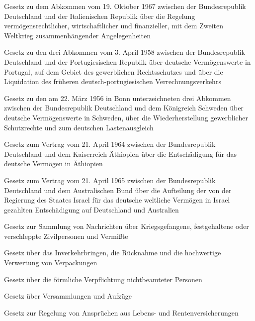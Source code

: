 \item[{VermRglAbkITAG}] Gesetz zu dem Abkommen vom 19. Oktober 1967 zwischen der Bundesrepublik Deutschland und der Italienischen Republik über die Regelung vermögensrechtlicher, wirtschaftlicher und finanzieller, mit dem Zweiten Weltkrieg zusammenhängender Angelegenheiten

\item[{VermRglAbkPRTG}] Gesetz zu den drei Abkommen vom 3. April 1958 zwischen der Bundesrepublik Deutschland und der Portugiesischen Republik über deutsche Vermögenswerte in Portugal, auf dem Gebiet des gewerblichen Rechtsschutzes und über die Liquidation des früheren deutsch-portugiesischen Verrechnungsverkehrs

\item[{VermRglAbkSWEG}] Gesetz zu den am 22. März 1956 in Bonn unterzeichneten drei Abkommen zwischen der Bundesrepublik Deutschland und dem Königreich Schweden über deutsche Vermögenswerte in Schweden, über die Wiederherstellung gewerblicher Schutzrechte und zum deutschen Lastenausgleich

\item[{VermRglVtrETHG}] Gesetz zum Vertrag vom 21. April 1964 zwischen der Bundesrepublik Deutschland und dem Kaiserreich Äthiopien über die Entschädigung für das deutsche Vermögen in Äthiopien

\item[{VermRglVtrISR-AUSG}] Gesetz zum Vertrag vom 21. April 1965 zwischen der Bundesrepublik Deutschland und dem Australischen Bund über die Aufteilung der von der Regierung des Staates Israel für das deutsche weltliche Vermögen in Israel gezahlten Entschädigung auf Deutschland und Australien

\item[{VermSammlG}] Gesetz zur Sammlung von Nachrichten über Kriegsgefangene, festgehaltene oder verschleppte Zivilpersonen und Vermißte

\item[{VerpackG}] Gesetz über das Inverkehrbringen, die Rücknahme und die hochwertige Verwertung von Verpackungen

\item[{VerpflG}] Gesetz über die förmliche Verpflichtung nichtbeamteter Personen

\item[{VersammlG}] Gesetz über Versammlungen und Aufzüge

\item[{VersAnsprReglG}] Gesetz zur Regelung von Ansprüchen aus Lebens- und Rentenversicherungen

